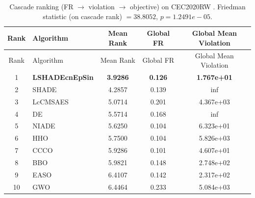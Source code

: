 \begin{center}
\small
\renewcommand{\arraystretch}{1.25}
\begin{longtable}{clccc}
\caption{Cascade ranking (FR $\to$ violation $\to$ objective) on CEC2020RW . Friedman statistic (on cascade rank) $=38.8052$, $p=1.2491e-05$.}
\label{tab:cascade_ranking_CEC2020RW} \\
\toprule
Rank & Algorithm & Mean Rank & Global FR & Global Mean Violation \\
\midrule
\endfirsthead
\toprule
Rank & Algorithm & Mean Rank & Global FR & Global Mean Violation \\
\midrule
\endhead
1 & \textbf{LSHADEcnEpSin} & \textbf{3.9286} & \textbf{0.126} & \textbf{1.767e+01} \\
2 & SHADE & 4.2857 & 0.139 & inf \\
3 & LcCMSAES & 5.0714 & 0.201 & 4.367e+03 \\
4 & DE & 5.5714 & 0.168 & inf \\
5 & NIADE & 5.6250 & 0.104 & 6.323e+01 \\
6 & HHO & 5.7500 & 0.104 & 5.826e+03 \\
7 & CCCO & 5.9286 & 0.101 & 4.607e+01 \\
8 & BBO & 5.9821 & 0.148 & 2.748e+02 \\
9 & EASO & 6.4107 & 0.142 & 2.317e+02 \\
10 & GWO & 6.4464 & 0.233 & 5.084e+03 \\
\bottomrule
\end{longtable}
\end{center}
